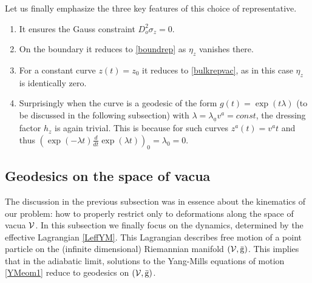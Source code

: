 \documentclass[11pt,a4paper]{article}
\def\calv{{\cal V}}
\def\ua{{\underline{a}}}
\def\rg{{\mathrm{g}}}
\begin{document}
        Let us finally emphasize the three key features of this choice of representative. 
        \begin{enumerate}
            \item It ensures the Gauss constraint $D_o^2\sigma_z=0$.
            \item On the boundary it reduces to \eqref{boundrep} as $\eta_z$ vanishes there.
            \item For a constant curve $z(t)=z_0$ it reduces to \eqref{bulkrepvac}, as in this case $\eta_z$ is identically zero. 
            \item Surprisingly when the curve is a geodesic of the form $g(t)=\exp(t\lambda)$ (to be discussed in the following subsection) with $\lambda=\lambda_\ua v^a=const$, the dressing factor $h_z$ is again trivial. This is because for such curves $z^a(t)=v^a t$ and thus $(\exp(-\lambda t)\frac{d}{dt}\exp(\lambda t))_0=\lambda_0=0$.
        \end{enumerate}

        
    
    \subsection{Geodesics on the space of vacua}\label{sec-geodesics}
    The discussion in the previous subsection was in essence about the kinematics of our problem: how to properly restrict only to deformations along the space of vacua $\calv$. In this subsection we finally focus on the dynamics, determined by the effective Lagrangian \eqref{LeffYM}. This Lagrangian describes free motion of a point particle on the (infinite dimensional) Riemannian manifold $(\calv,\bar{\rg})$. This implies that in the adiabatic limit, solutions to the Yang-Mills equations of motion \eqref{YMeom1} reduce to geodesics on $(\calv,\bar{\rg})$.
    
\end{document}
